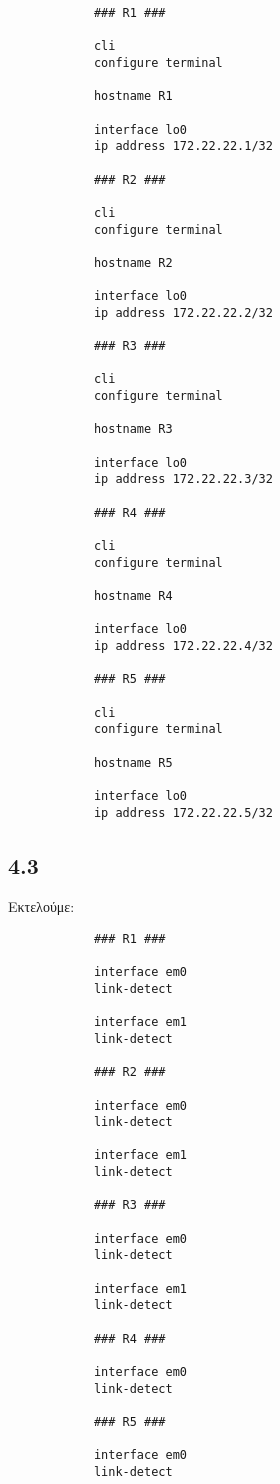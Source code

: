 \documentclass[a4paper, 12pt]{article}
\begin{document}
		\begin{verbatim}
			### R1 ###
			
			cli
			configure terminal
			
			hostname R1
			
			interface lo0
			ip address 172.22.22.1/32
	
			### R2 ###
			
			cli
			configure terminal
			
			hostname R2
			
			interface lo0
			ip address 172.22.22.2/32
	
			### R3 ###
			
			cli
			configure terminal
			
			hostname R3
			
			interface lo0
			ip address 172.22.22.3/32
	
			### R4 ###
			
			cli
			configure terminal
			
			hostname R4
			
			interface lo0
			ip address 172.22.22.4/32
	
			### R5 ###
			
			cli
			configure terminal
			
			hostname R5
			
			interface lo0
			ip address 172.22.22.5/32
		\end{verbatim}
		
	\subsection*{4.3}
		Εκτελούμε:
		
		\begin{verbatim}
			### R1 ###
			
			interface em0
			link-detect
			
			interface em1
			link-detect
			
			### R2 ###
			
			interface em0
			link-detect
			
			interface em1
			link-detect
			
			### R3 ###
			
			interface em0
			link-detect
			
			interface em1
			link-detect
			
			### R4 ###
			
			interface em0
			link-detect
			
			### R5 ###
			
			interface em0
			link-detect
		\end{verbatim}
	
\end{document}
